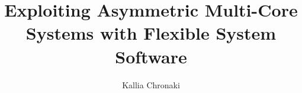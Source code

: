 \title{Exploiting Asymmetric Multi-Core Systems with Flexible System Software}


\author{Kallia Chronaki}



\renewcommand{\submissiontext}{This dissertation is submitted for the degree of}




